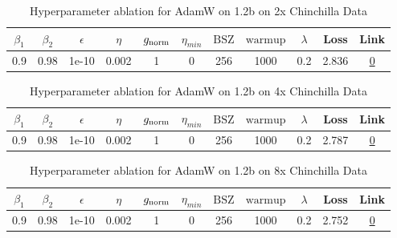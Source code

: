 \begin{table}[H]
\centering
\caption{Hyperparameter ablation for AdamW on 1.2b on 2x Chinchilla Data}
\label{tab:ablation_adamw_1.2b_on_2x_chinchilla_data}
\begin{tabular}{ccccccccccc}
\toprule
$\beta_1$ & $\beta_2$ & $\epsilon$ & $\eta$ & $g_{\mathrm{norm}}$ & $\eta_{min}$ & $\mathrm{BSZ}$ & $\mathrm{warmup}$ & $\lambda$ & Loss & Link \\
\midrule
0.9 & 0.98 & 1e-10 & 0.002 & 1 & 0 & 256 & 1000 & 0.2 & 2.836 & \href{https://wandb.ai/marin-community/optimizer-scaling/runs/sweep-1.2b-48B-adamw7ebb9alr0.002-wd0.2-minlr0.0-warmup1000-b10.-994f23}{0} \\
\midrule
\bottomrule
\end{tabular}
\end{table}

\begin{table}[H]
\centering
\caption{Hyperparameter ablation for AdamW on 1.2b on 4x Chinchilla Data}
\label{tab:ablation_adamw_1.2b_on_4x_chinchilla_data}
\begin{tabular}{ccccccccccc}
\toprule
$\beta_1$ & $\beta_2$ & $\epsilon$ & $\eta$ & $g_{\mathrm{norm}}$ & $\eta_{min}$ & $\mathrm{BSZ}$ & $\mathrm{warmup}$ & $\lambda$ & Loss & Link \\
\midrule
0.9 & 0.98 & 1e-10 & 0.002 & 1 & 0 & 256 & 1000 & 0.2 & 2.787 & \href{https://wandb.ai/marin-community/optimizer-scaling/runs/sweep-1.2b-96B-adamw71c224lr0.002-wd0.2-minlr0.0-warmup1000-b10.-66682a}{0} \\
\midrule
\bottomrule
\end{tabular}
\end{table}

\begin{table}[H]
\centering
\caption{Hyperparameter ablation for AdamW on 1.2b on 8x Chinchilla Data}
\label{tab:ablation_adamw_1.2b_on_8x_chinchilla_data}
\begin{tabular}{ccccccccccc}
\toprule
$\beta_1$ & $\beta_2$ & $\epsilon$ & $\eta$ & $g_{\mathrm{norm}}$ & $\eta_{min}$ & $\mathrm{BSZ}$ & $\mathrm{warmup}$ & $\lambda$ & Loss & Link \\
\midrule
0.9 & 0.98 & 1e-10 & 0.002 & 1 & 0 & 256 & 1000 & 0.2 & 2.752 & \href{https://wandb.ai/marin-community/optimizer-scaling/runs/sweep-1.2b-193B-adamw1eeba1lr0.002-wd0.2-minlr0.0-warmup1000-b10-44a428}{0} \\
\midrule
\bottomrule
\end{tabular}
\end{table}

